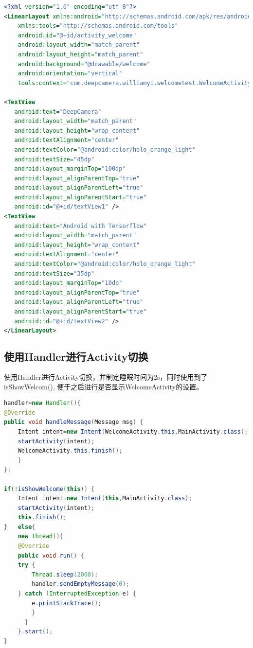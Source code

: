 \documentclass[UTF8, Microsoft YaHei]{book}
\begin{document}
\begin{small}
\begin{lstlisting}[language=xml]
<?xml version="1.0" encoding="utf-8"?>
<LinearLayout xmlns:android="http://schemas.android.com/apk/res/android"
    xmlns:tools="http://schemas.android.com/tools"
    android:id="@+id/activity_welcome"
    android:layout_width="match_parent"
    android:layout_height="match_parent"
    android:background="@drawable/welcome"
    android:orientation="vertical"
    tools:context="com.deepcamera.williamyi.welcometest.WelcomeActivity">

<TextView
   android:text="DeepCamera"
   android:layout_width="match_parent"
   android:layout_height="wrap_content"
   android:textAlignment="center"
   android:textColor="@android:color/holo_orange_light"
   android:textSize="45dp"
   android:layout_marginTop="100dp"
   android:layout_alignParentTop="true"
   android:layout_alignParentLeft="true"
   android:layout_alignParentStart="true"
   android:id="@+id/textView1" />
<TextView
   android:text="Android with Tensorflow"
   android:layout_width="match_parent"
   android:layout_height="wrap_content"
   android:textAlignment="center"
   android:textColor="@android:color/holo_orange_light"
   android:textSize="35dp"
   android:layout_marginTop="10dp"
   android:layout_alignParentTop="true"
   android:layout_alignParentLeft="true"
   android:layout_alignParentStart="true"
   android:id="@+id/textView2" />
</LinearLayout>
\end{lstlisting}
\end{small}

    \subsection{使用Handler进行Activity切换}
    使用Handler进行Activity切换，并制定睡眠时间为2s，同时使用到了isShowWelcom(), 便于之后进行是否显示WelcomeActivity的设置。

\begin{small}
\begin{lstlisting}[language=java]
handler=new Handler(){
@Override
public void handleMessage(Message msg) {
    Intent intent=new Intent(WelcomeActivity.this,MainActivity.class);
    startActivity(intent);
    WelcomeActivity.this.finish();
    }
};

if(!isShowWelcome(this)) {
    Intent intent=new Intent(this,MainActivity.class);
    startActivity(intent);
    this.finish();
}   else{
    new Thread(){
    @Override
    public void run() {
    try {
        Thread.sleep(2000);
        handler.sendEmptyMessage(0);
    } catch (InterruptedException e) {
        e.printStackTrace();
        }
      }
    }.start();
}
\end{lstlisting}
\end{small}
\end{document}

